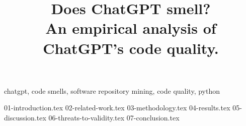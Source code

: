 \documentclass[conference]{IEEEtran}
\begin{document}
\title{Does ChatGPT smell?\\
{\footnotesize An empirical analysis of ChatGPT's code quality.}
}

\author{
}

\maketitle

\begin{abstract}
\end{abstract}

\begin{IEEEkeywords}
    chatgpt, code smells, software repository mining, code quality, python
\end{IEEEkeywords}


{01-introduction.tex}
{02-related-work.tex}
{03-methodology.tex}
{04-results.tex}
{05-discussion.tex}
{06-threats-to-validity.tex}
{07-conclusion.tex}
\end{document}
